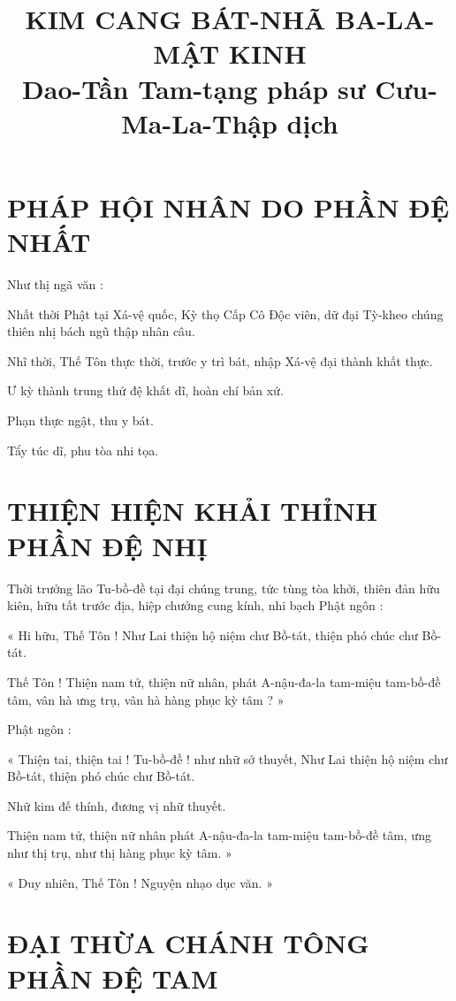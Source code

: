 
	\title{KIM CANG BÁT-NHÃ BA-LA-MẬT KINH \\ Dao-Tần Tam-tạng pháp sư Cưu-Ma-La-Thập dịch}
	
	\vspace{1em}

	
	\section*{PHÁP HỘI NHÂN DO PHẦN ĐỆ NHẤT}
	
	Như thị ngã văn : 
	
	Nhất thời Phật tại Xá-vệ quốc, Kỳ thọ Cấp Cô Độc viên, dữ đại Tỳ-kheo chúng thiên nhị bách ngũ thập nhân câu. 
	
	Nhĩ thời, Thế Tôn thực thời, trước y trì bát, nhập Xá-vệ đại thành khất thực. 
	
	Ư kỳ thành trung thứ đệ khất dĩ, hoàn chí bản xứ. 
	
	Phạn thực ngật, thu y bát. 
	
	Tẩy túc dĩ, phu tòa nhi tọa.
	
	\section*{THIỆN HIỆN KHẢI THỈNH PHẦN ĐỆ NHỊ}
	
	Thời trưởng lão Tu-bồ-đề tại đại chúng trung, tức tùng tòa khởi, thiên đản hữu kiên, hữu tất trước địa, hiệp chưởng cung kính, nhi bạch Phật ngôn :
	
	« Hi hữu, Thế Tôn ! Như Lai thiện hộ niệm chư Bồ-tát, thiện phó chúc chư Bồ-tát. 
	
	Thế Tôn ! Thiện nam tử, thiện nữ nhân, phát A-nậu-đa-la tam-miệu tam-bồ-đề tâm, vân hà ưng trụ, vân hà hàng phục kỳ tâm ? »
	
	Phật ngôn :
	
	« Thiện tai, thiện tai ! Tu-bồ-đề ! như nhữ sở thuyết, Như Lai thiện hộ niệm chư Bồ-tát, thiện phó chúc chư Bồ-tát. 
	
	Nhữ kim đế thính, đương vị nhữ thuyết. 
	
	Thiện nam tử, thiện nữ nhân phát A-nậu-đa-la tam-miệu tam-bồ-đề tâm, ưng như thị trụ, như thị hàng phục kỳ tâm. »
	
	« Duy nhiên, Thế Tôn ! Nguyện nhạo dục văn. »
	
	\section*{ĐẠI THỪA CHÁNH TÔNG PHẦN ĐỆ TAM}
	
